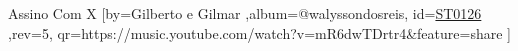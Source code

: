 \beginsong
{Assino Com X %
}[by={Gilberto e Gilmar %
},album={@walyssondosreis},
id={\href{https://music.youtube.com/watch?v=mR6dwTDrtr4&feature=share %
}{ST0126 %
}},rev={5}, %
qr={https://music.youtube.com/watch?v=mR6dwTDrtr4&feature=share %
}]
\beginverse
